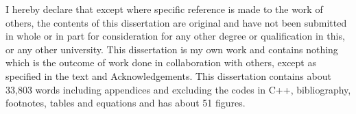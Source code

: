 
\begin{declaration}

I hereby declare that except where specific reference is made to the work of 
others, the contents of this dissertation are original and have not been 
submitted in whole or in part for consideration for any other degree or 
qualification in this, or any other university. This dissertation is my own 
work and contains nothing which is the outcome of work done in collaboration 
with others, except as specified in the text and Acknowledgements. This 
dissertation contains about 33,803 words including appendices and excluding the codes in C++, 
bibliography, footnotes, tables and equations and has about 51 figures.


\end{declaration}
